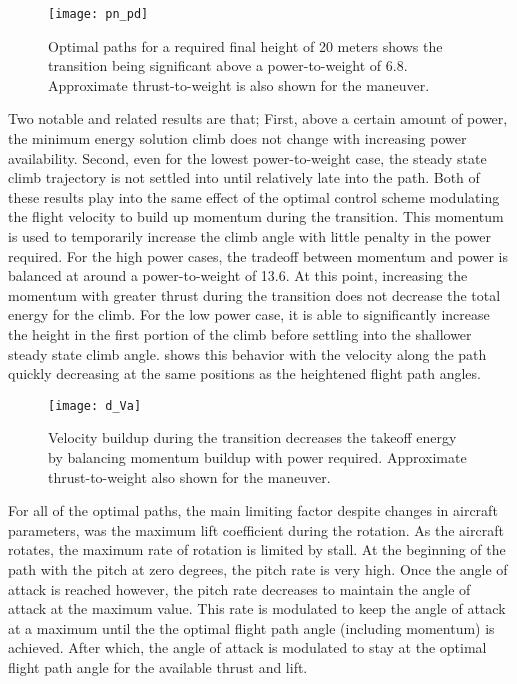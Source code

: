 \documentclass[10pt,english]{article}
\begin{document}
\begin{figure}[H]
\centering
\texttt{[image: pn\_pd]}
\vspace{-5pt}
\caption{Optimal paths for a required final height of 20 meters shows the transition being significant above a power-to-weight of 6.8. Approximate thrust-to-weight is also shown for the maneuver.}
\label{f:dyanmic_path}
\end{figure}

Two notable and related results are that; First, above a certain amount of power, the minimum energy solution climb does not change with increasing power availability. Second, even for the lowest power-to-weight case, the steady state climb trajectory is not settled into until relatively late into the path.  Both of these results play into the same effect of the optimal control scheme modulating the flight velocity to build up momentum during the transition.  This momentum is used to temporarily increase the climb angle with little penalty in the power required.  For the high power cases, the tradeoff between momentum and power is balanced at around a power-to-weight of 13.6.  At this point, increasing the momentum with greater thrust during the transition does not decrease the total energy for the climb.  For the low power case, it is able to significantly increase the height in the first portion of the climb before settling into the shallower steady state climb angle.   shows this behavior with the velocity along the path quickly decreasing at the same positions as the heightened flight path angles.


\begin{figure}[H]
\centering
\texttt{[image: d\_Va]}
\vspace{-5pt}
\caption{Velocity buildup during the transition decreases the takeoff energy by balancing momentum buildup with power required. Approximate thrust-to-weight also shown for the maneuver.}
\label{f:d_Va}
\end{figure}

For all of the optimal paths, the main limiting factor despite changes in aircraft parameters, was the maximum lift coefficient during the rotation.  As the aircraft rotates, the maximum rate of rotation is limited by stall.  At the beginning of the path with the pitch at zero degrees, the pitch rate is very high.  Once the angle of attack is reached however, the pitch rate decreases to maintain the angle of attack at the maximum value.  This rate is modulated to keep the angle of attack at a maximum until the the optimal flight path angle (including momentum) is achieved.  After which, the angle of attack is modulated to stay at the optimal flight path angle for the available thrust and lift.
\end{document}
